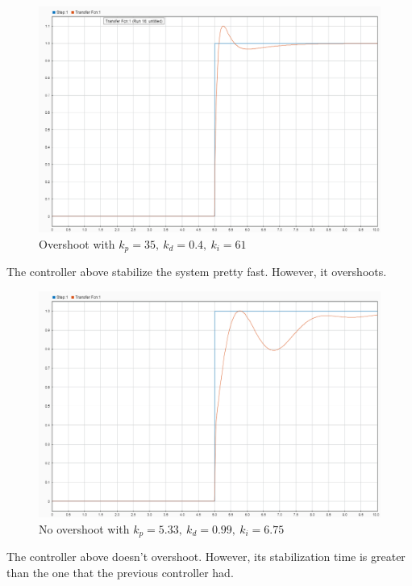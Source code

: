 \documentclass{article}
\begin{document}
\begin{figure}[hbt!]
        \centering
        \includegraphics[scale=0.3]{hw3_3overshoot.png}
        \caption{Overshoot with $k_p = 35, \ k_d = 0.4, \ k_i = 61$}
\end{figure}

\noindent
The controller above stabilize the system pretty fast. However, it overshoots.


\begin{figure}[hbt!]
        \centering
        \includegraphics[scale=0.3]{hw3_3no_overshoot.png}
        \caption{No overshoot with $k_p = 5.33, \ k_d = 0.99, \ k_i = 6.75$}
\end{figure}

\noindent
The controller above doesn't overshoot. However, its stabilization time is greater than the one that the previous controller had.

\smallbreak
\end{document}
